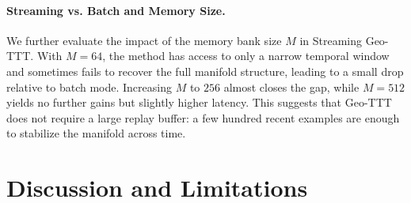 \documentclass{article}
\theoremstyle{plain}
\theoremstyle{definition}
\theoremstyle{remark}
\begin{document}
\begin{table}[t]
\caption{Ablation on ARC-Challenge with Llama-3-8B, varying the number of neighbors $k$ and smoothness $\mu$. Accuracy (\%) averaged over 3 seeds. Geo-TTT is robust across a wide range of settings, with $k=20$ and $\mu=1.0$ used as default.}
\label{tab:ablation}
\vskip 0.15in
\begin{center}
\begin{small}
\begin{sc}
\end{sc}
\end{small}
\end{center}
\vskip -0.1in
\end{table}

\paragraph{Streaming vs. Batch and Memory Size.}
We further evaluate the impact of the memory bank size $M$ in Streaming Geo-TTT. With $M=64$, the method has access to only a narrow temporal window and sometimes fails to recover the full manifold structure, leading to a small drop relative to batch mode. Increasing $M$ to $256$ almost closes the gap, while $M=512$ yields no further gains but slightly higher latency. This suggests that Geo-TTT does not require a large replay buffer: a few hundred recent examples are enough to stabilize the manifold across time.



\section{Discussion and Limitations}
\label{sec:discussion}
\end{document}
